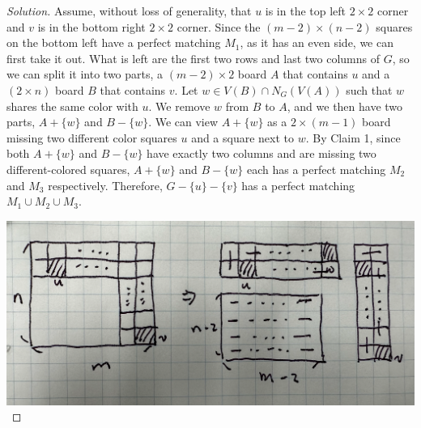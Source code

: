 \documentclass{article}
\begin{document}
\begin{enumerate}[label=(\alph*)]
\begin{proof}[Solution]
        Assume, without loss of generality, that $u$ is in the top left $2 \times 2$ corner and $v$ is in the bottom right $2 \times 2$ corner. Since the $(m - 2) \times (n - 2)$ squares on the bottom left have a perfect matching $M_1$, as it has an even side, we can first take it out. What is left are the first two rows and last two columns of $G$, so we can split it into two parts, a $(m - 2) \times 2$ board $A$ that contains $u$ and a $(2 \times n)$ board $B$ that contains $v$. Let $w \in V(B) \cap N_G(V(A))$ such that $w$ shares the same color with $u$. We remove $w$ from $B$ to $A$, and we then have two parts, $A + \{w\}$ and $B - \{w\}$. We can view $A + \{w\}$ as a $2 \times (m - 1)$ board missing two different color squares $u$ and a square next to $w$. By Claim 1, since both $A + \{w\}$ and $B - \{w\}$ have exactly two columns and are missing two different-colored squares, $A + \{w\}$ and $B - \{w\}$ each has a perfect matching $M_2$ and $M_3$ respectively. Therefore, $G - \{u\} - \{v\}$ has a perfect matching $M_1 \cup M_2 \cup M_3$.

        \includegraphics[width=.93\textwidth]{Q382b2}


\end{proof}
\end{enumerate}
\end{document}
